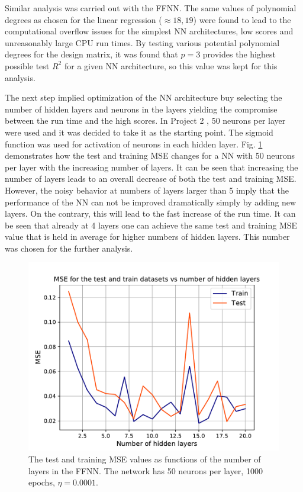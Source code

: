 \documentclass[numberedappendix, twocolappendix]{emulateapj}
\begin{document}
Similar analysis was carried out with the FFNN. The same values of polynomial degrees as chosen for the linear regression ($\approx 18,19$) were found to lead to the computational overflow issues for the simplest NN architectures, low scores and unreasonably large CPU run times. By testing various potential polynomial degrees for the design matrix, it was found that $p=3$ provides the highest possible test $R^2$ for a given NN architecture, so this value was kept for this analysis. 

The next step implied optimization of the NN architecture buy selecting the number of hidden layers and neurons in the layers yielding the compromise between the run time and the high scores. In Project 2 \cite{proj2}, 50 neurons per layer were used and it was decided to take it as the starting point. The sigmoid function was used for activation of neurons in each hidden layer. Fig. \ref{fig: layers}  demonstrates how the test and training MSE changes for a NN with 50 neurons per layer with the increasing number of layers. It can be seen that increasing the number of layers leads to an overall decrease of both the test and training MSE. However, the noisy behavior at numbers of layers larger than 5 imply that the performance of the NN can not be improved dramatically simply by adding new layers. On the contrary, this will lead to the fast increase of the run time. It can be seen that already at 4 layers one can achieve the same test and training MSE value that is held in average for higher numbers of hidden layers. This number was chosen for the further analysis.

\begin{figure}[!htb]
    \centering
    \includegraphics[width=.49\textwidth]{Figures/NN_layers.pdf}
    \caption{The test and training MSE values as functions of the number of layers in the FFNN. The network has 50 neurons per layer, 1000 epochs, $\eta=0.0001$.}
    \label{fig: layers}
\end{figure}
\end{document}
